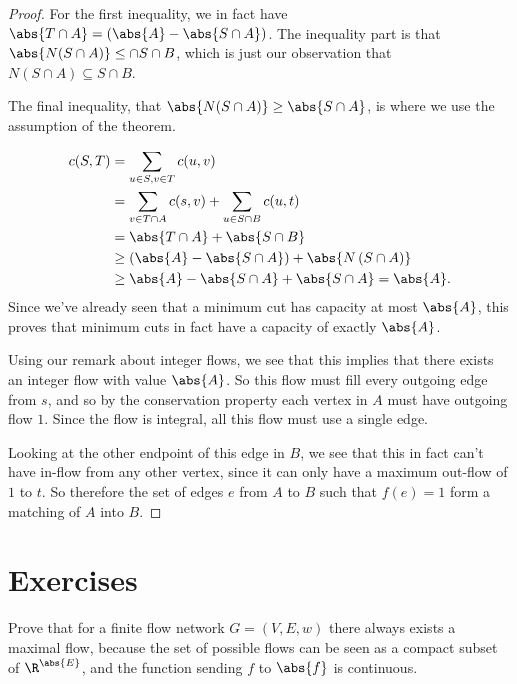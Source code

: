 \documentclass[nobib]{tufte-handout}
\begin{document}
\begin{theorem}
\begin{proof}
{        For the first inequality, we in fact have $\abs{T\cap A} = (\abs{A} - \abs{S \cap A})$. The inequality part is that $\abs{N(S\cap A)} \leq \cap{S\cap B}$, which is just our observation that $N(S \cap A) \subseteq S \cap B$.
        
        The final inequality, that $\abs{N(S\cap A)} \geq \abs{S \cap A}$, is where we use the assumption of the theorem.}
        \begin{align*}
            c(S,T) &= \sum_{u \in S, v \in T} c(u,v)\\
            &= \sum_{v \in T \cap A} c(s,v) + \sum_{u \in S\cap B} c(u,t)\\
            &= \abs{T \cap A} + \abs{S \cap B}\\
            &\geq \left(\abs{A} - \abs{S\cap A}\right) + \abs{N\left(S\cap A\right)}\\
            &\geq \abs{A} - \abs{S\cap A} + \abs{S\cap A} = \abs{A}.
        \end{align*}
        Since we've already seen that a minimum cut has capacity at most $\abs{A}$, this proves that minimum cuts in fact have a capacity of exactly $\abs{A}$.

        Using our remark about integer flows, we see that this implies that there exists an integer flow with value $\abs{A}$. So this flow must fill every outgoing edge from $s$, and so by the conservation property each vertex in $A$ must have outgoing flow $1$. Since the flow is integral, all this flow must use a single edge.

        Looking at the other endpoint of this edge in $B$, we see that this in fact can't have in-flow from any other vertex, since it can only have a maximum out-flow of $1$ to $t$. So therefore the set of edges $e$ from $A$ to $B$ such that $f(e) = 1$ form a matching of $A$ into $B$.
    \end{proof}
\end{theorem}

\section{Exercises}

\begin{xca}
    Prove that for a finite flow network $G = (V,E,w)$ there always exists a maximal flow, because the set of possible flows can be seen as a compact subset of $\R^{\abs{E}}$, and the function sending $f$ to $\abs{f}$ is continuous.
\end{xca}
\end{document}
